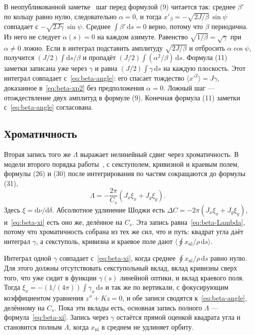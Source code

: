 \documentclass[aps,pra,preprint,a4paper,amsmath,amssymb,longbibliography]{revtex4-2}
\begin{document}
В неопубликованной заметке~\cite{SenichevNote} шаг перед формулой (9) читается так: среднее $\beta'$ по кольцу равно нулю, следовательно $\alpha=0$, и тогда $x'_\beta=-\sqrt{2J/\beta}\,\sin\psi$ совпадает с $-\sqrt{2J\gamma}\,\sin\psi$. Среднее $\int\beta'\,\mathrm{d}s=0$ верно, потому что $\beta$ периодична. Из него не следует $\alpha(s)=0$ на каждом азимуте. Равенство $\sqrt{1/\beta}=\sqrt{\gamma}$ при $\alpha\neq 0$ ложно. Если в интеграл подставить амплитуду $\sqrt{2J/\beta}$ и отбросить $\alpha\cos\psi$, получится $(J/2)\int\mathrm{d}s/\beta$ и пропадёт $(J/2)\int(\alpha^2/\beta)\,\mathrm{d}s$. Формула (11) заметки записана уже через $\gamma$ и равна $(J/2)\int\gamma\,\mathrm{d}s$ на каждую плоскость. Этот интеграл совпадает с~\eqref{eq:beta-angle}: его спасает тождество $\langle x'^2\rangle=J\gamma$, доказанное в~\eqref{eq:beta-xp2} без предположения $\alpha=0$. Ложный шаг --- отождествление двух амплитуд в формуле (9). Конечная формула (11) заметки с~\eqref{eq:beta-angle} согласована.

\subsection{Хроматичность}
\label{sec:ch2-xi}

Вторая запись того же $\Lambda$ выражает нелинейный сдвиг через хроматичность. В модели второго порядка работы~\cite{Shoji2005}, с секступолем, кривизной и краевым полем, формулы (26) и (30) после интегрирования по частям сокращаются до формулы (31),
\begin{equation}
\label{eq:beta-xi}
\Lambda
=-\frac{2\pi}{C_s}(J_x\xi_x+J_y\xi_y).
\end{equation}
Здесь $\xi=\mathrm{d}\nu/\mathrm{d}\delta$. Абсолютное удлинение Шоджи есть $\Delta C=-2\pi(J_x\xi_x+J_y\xi_y)$, и~\eqref{eq:beta-xi} есть оно же, делённое на $C_s$. Эта запись равна~\eqref{eq:beta-Lambda}, потому что хроматичность собрана из тех же сил, что и путь: квадрат угла даёт интеграл $\gamma$, а секступоль, кривизна и краевое поле дают $\langle\oint x_{\mathrm{nl}}/\rho\,\mathrm{d}s\rangle$.

Интеграл одной $\gamma$ совпадает с~\eqref{eq:beta-xi}, когда среднее $\oint x_{\mathrm{nl}}/\rho\,\mathrm{d}s$ равно нулю. Для этого должны отсутствовать секступольный вклад, вклад кривизны сверх того, что уже сидит в функции $\gamma(s)$ линейной оптики, и вклад краевого поля. Тогда $\xi_x=-(1/(4\pi))\int\gamma_x\,\mathrm{d}s$ и так же по вертикали, с фокусирующим коэффициентом уравнения $z''+Kz=0$, и обе записи сводятся к~\eqref{eq:beta-angle}, делённому на $C_s$. Пока эти вклады есть, основная запись полного $\Lambda$ --- формула~\eqref{eq:beta-xi}. Запись через $\gamma$ остаётся прямой оценкой квадрата угла и становится полным $\Lambda$, когда $x_{\mathrm{nl}}$ в среднем не удлиняет орбиту.
\end{document}
